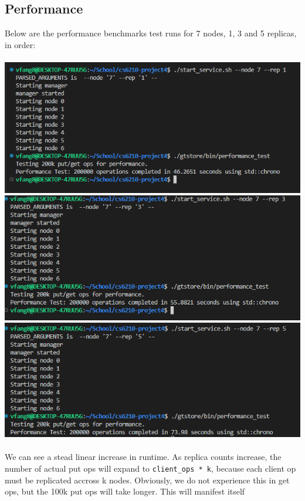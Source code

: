 \documentclass{article}
\begin{document}
\subsection{Performance}
Below are the performance benchmarks test runs for 7 nodes, 1, 3 and 5 replicas, in order:\\\\
\includegraphics[width=\linewidth]{img/Performance71.png}\\
\includegraphics[width=\linewidth]{img/Performance73.png}\\
\includegraphics[width=\linewidth]{img/Performance75.png}\\\\
We can see a stead linear increase in runtime. As replica counts increase, the number of actual put ops will expand to \texttt{client_ops * k}, because each 
client op must be replicated accross k nodes. Obviously, we do not experience this in get ops, but the 100k put ops will take longer. This will manifest itself 
\end{document}
